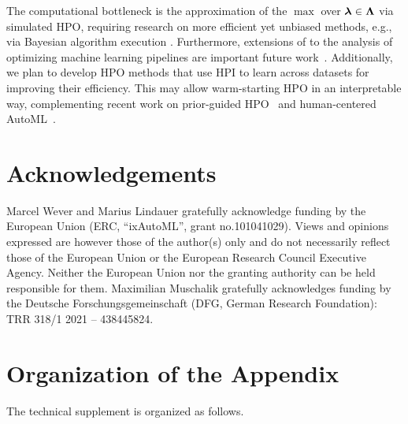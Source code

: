 \documentclass[letterpaper]{article} %
\begin{document}
The computational bottleneck is the approximation of the $\max$ over $\boldsymbol{\lambda} \in \boldsymbol{\Lambda}$ via simulated HPO, requiring research on more efficient yet unbiased methods, e.g., via Bayesian algorithm execution \cite{bobax}. 
Furthermore, extensions of \tool to the analysis of optimizing machine learning pipelines are important future work~\citep{HeffetzVKR20,FeurerEFLH22,wever-ida2020a,wever-tpami21a}.
Additionally, we plan to develop HPO methods that use HPI to learn across datasets for improving their efficiency. This may allow warm-starting HPO in an interpretable way, complementing recent work on prior-guided HPO~\citep{HvarfnerHN24,fehring-arxiv25} and human-centered AutoML~\citep{LindauerKKMT0HF24}.


\section*{Acknowledgements}
Marcel Wever and Marius Lindauer gratefully acknowledge funding by the European Union (ERC, ``ixAutoML'', grant no.101041029). Views and opinions expressed are however those of the author(s) only and do not necessarily reflect those of the European Union or the European Research Council Executive Agency. Neither the European Union nor the granting authority can be held responsible for them. Maximilian Muschalik gratefully acknowledges funding by the Deutsche Forschungsgemeinschaft (DFG, German Research Foundation): TRR 318/1 2021 – 438445824.


\clearpage

\appendix
\onecolumn
\section*{Organization of the Appendix}

The technical supplement is organized as follows.
\end{document}
